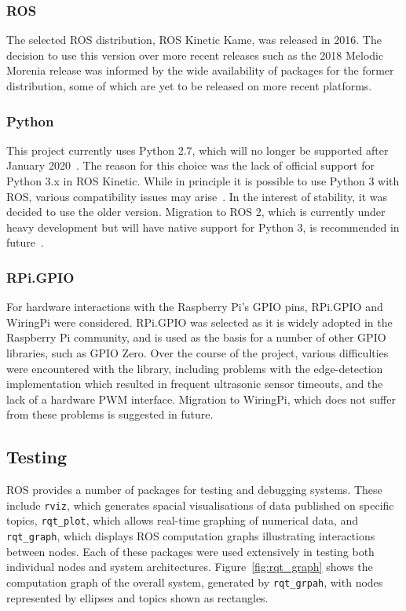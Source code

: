 \subsubsection{ROS}
The selected ROS distribution, ROS Kinetic Kame, was released in 2016. The
decision to use this version over more recent releases such as the 2018
Melodic Morenia release was informed by the wide availability of packages
for the former distribution, some of which are yet to be released on more
recent platforms.

\subsubsection{Python}
This project currently uses Python 2.7, which will no longer be supported
after January 2020~\cite{python2-eol}. The reason for this choice was the
lack of official support for Python 3.x in ROS Kinetic. While in principle
it is possible to use Python 3 with ROS, various compatibility issues may
arise~\cite{medium-ros-python3}. In the interest of stability,
it was decided to use the older version. Migration to ROS 2, which is
currently under heavy development but will have native support for Python
3, is recommended in future~\cite{ros2}.

\subsubsection{RPi.GPIO}
For hardware interactions with the Raspberry Pi's GPIO pins, RPi.GPIO and
WiringPi were considered. RPi.GPIO was selected as it is widely adopted in
the Raspberry Pi community, and is used as the basis for a number of other
GPIO libraries, such as GPIO Zero. Over the course of the project, various difficulties were encountered with
the library, including problems with the edge-detection implementation which
resulted in frequent ultrasonic sensor timeouts, and the lack of a hardware
PWM interface. Migration to WiringPi, which does not suffer from these problems
is suggested in future.


\subsection{Testing}\label{soft/ROS/test}
ROS provides a number of packages for testing and debugging systems. These
include \verb|rviz|, which generates spacial visualisations of data published
on specific topics, \verb|rqt_plot|, which allows real-time graphing of
numerical data, and \verb|rqt_graph|, which displays ROS computation graphs
illustrating interactions between nodes. Each of these packages were used
extensively in testing both individual nodes and system architectures.
Figure~\ref{fig:rqt_graph} shows the computation graph of the overall system,
generated by \verb|rqt_grpah|, with nodes represented by ellipses and topics
shown as rectangles.

